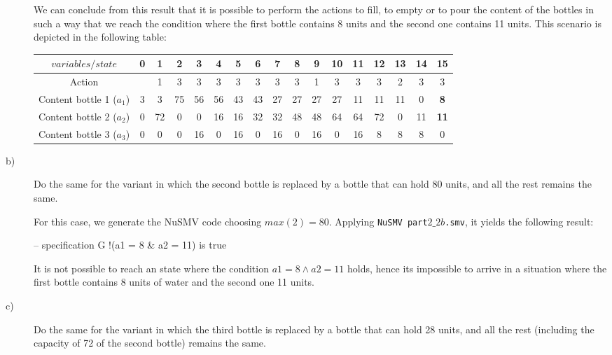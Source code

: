 \begin{description}
  We can conclude from this result that it is possible to perform the actions to fill, to empty or to pour the content of the bottles in such a way that we reach the condition where the first bottle contains 8 units and the second one contains 11 units. This scenario is depicted in the following table:

  \begin{center}
\begin{tabular}{|c|c|c|c|c|c|c|c|c|c|c|c|c|c|c|c|c|}
  \hline
  $variables/state$ & 0 & 1 & 2 & 3 & 4 & 5 & 6 & 7 & 8 & 9 & 10 & 11 & 12 & 13 & 14 & 15  \\
  \hline
  Action &  & 1  & 3 & 3 & 3 & 3 & 3 & 3 & 3 & 1 & 3 & 3 & 3 & 2 & 3  & 3  \\
  Content bottle 1 ($a_1$) & 3 & 3  & 75 & 56 & 56 & 43 & 43 & 27 & 27 & 27 & 27 & 11 & 11 & 11 & 0  & \textbf{8}  \\
  Content bottle 2 ($a_2$) & 0 & 72 & 0  & 0  & 16 & 16 & 32 & 32 & 48 & 48 & 64 & 64 & 72 & 0  & 11 & \textbf{11} \\
  Content bottle 3 ($a_3$) & 0 & 0  & 0  & 16 & 0  & 16 & 0  & 16 & 0  & 16 & 0  & 16 & 8  & 8  & 8  & 0  \\
  \hline
\end{tabular}
\end{center}

  \item[b)] Do the same for the variant in which the second bottle is replaced by a bottle that can hold 80 units, and all the rest remains the same.

  For this case, we generate the NuSMV code choosing $max(2)=80$. Applying {\tt NuSMV part$2\_2b$.smv}, it yields the following result:

      \vspace{2mm}
\selectfont
{\footnotesize
\noindent
-- specification  G !(a1 = 8 \& a2 = 11)  is true
}
\selectfont
  \vspace{2mm}

  It is not possible to reach an state where the condition $a1 = 8 \wedge a2 = 11$ holds, hence its impossible to arrive in a situation where the first bottle contains 8 units of water and the second one 11 units.

  \item[c)] Do the same for the variant in which the third bottle is replaced by a bottle that can hold 28 units, and all the rest (including the capacity of 72 of the second bottle) remains the same.


\end{description}
